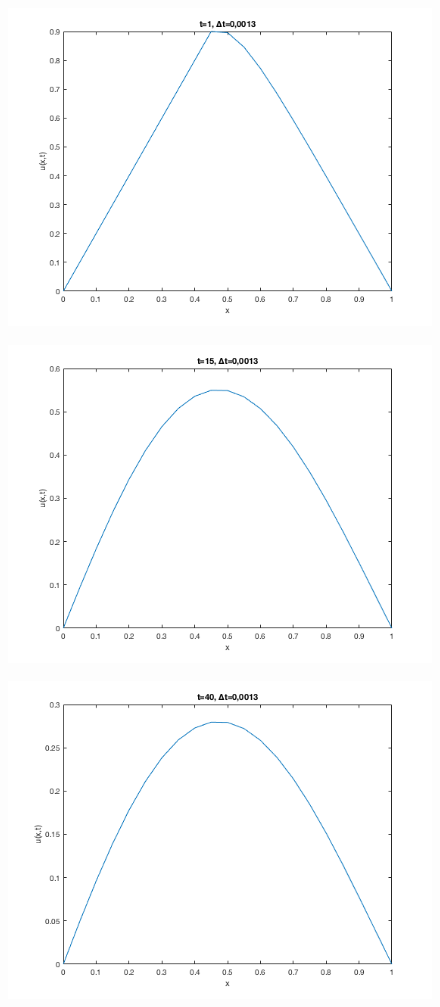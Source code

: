 \documentclass[paper=a4, fontsize=11pt]{scrartcl} %
\numberwithin{equation}{section} %
\numberwithin{figure}{section} %
\numberwithin{table}{section} %
\begin{document}
\begin{figure}[h]
\centering
\includegraphics[scale=0.6]{graph4}
\end{figure}
\begin{figure}[h]
\centering
\includegraphics[scale=0.6]{graph5}
\end{figure}
\begin{figure}[h]
\centering
\includegraphics[scale=0.6]{graph6}
\end{figure}
\end{document}
